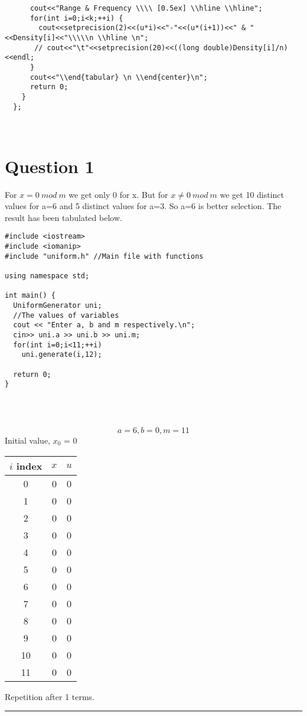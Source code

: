 \documentclass{article}
\begin{document}
\begin{lstlisting}
      cout<<"Range & Frequency \\\\ [0.5ex] \\hline \\hline";
      for(int i=0;i<k;++i) {
        cout<<setprecision(2)<<(u*i)<<"-"<<(u*(i+1))<<" & "<<Density[i]<<"\\\\\n \\hline \n";
       // cout<<"\t"<<setprecision(20)<<((long double)Density[i]/n)<<endl;
      }
      cout<<"\\end{tabular} \n \\end{center}\n";
      return 0;
    }
  };



\end{lstlisting}

\section{Question 1}
For $x=0\ mod\ m$ we get only 0 for x. But for $x\neq 0\ mod\ m$ we get 10 distinct values for a=6 and 5 distinct values for a=3. So a=6 is better selection. The result has been tabulated below.


\begin{lstlisting}
#include <iostream>
#include <iomanip>
#include "uniform.h" //Main file with functions

using namespace std;

int main() {
  UniformGenerator uni;
  //The values of variables
  cout << "Enter a, b and m respectively.\n";
  cin>> uni.a >> uni.b >> uni.m;
  for(int i=0;i<11;++i)
    uni.generate(i,12);

  return 0;
}




\end{lstlisting}

$$a = 6, b = 0, m = 11$$
Initial value, $x_0$ = 0
\begin{center} \begin{tabular}{||c | c | c||}  \hline
		$i$ index & $x$ & $u$ \\ [0.5ex] \hline \hline0 & 0 & 0\\
		\hline 
		1 & 0 & 0\\
		\hline 
		2 & 0 & 0\\
		\hline 
		3 & 0 & 0\\
		\hline 
		4 & 0 & 0\\
		\hline 
		5 & 0 & 0\\
		\hline 
		6 & 0 & 0\\
		\hline 
		7 & 0 & 0\\
		\hline 
		8 & 0 & 0\\
		\hline 
		9 & 0 & 0\\
		\hline 
		10 & 0 & 0\\
		\hline 
		11 & 0 & 0\\
		\hline 
	\end{tabular} 
\end{center} Repetition after 1 terms.
\\ \noindent\rule[0.5ex]{\linewidth}{1pt}
\pagebreak
\end{document}
